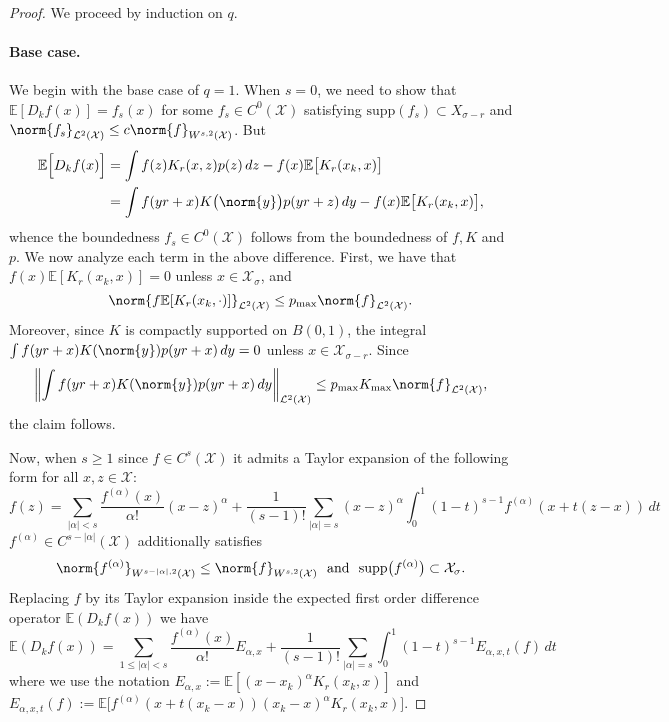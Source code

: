 \documentclass{article}
\newcommand{\abs}[1]{\left \lvert #1 \right \rvert}
\newcommand{\1}{\mathbf{1}}
\newcommand{\Xset}{\mathcal{X}}
\newcommand{\Leb}{\mathcal{L}}
\newcommand{\Ebb}{\mathbb{E}}
\theoremstyle{alden}
\theoremstyle{aldenthm}
\theoremstyle{definition}
\theoremstyle{remark}
\begin{document}
\begin{proof}	
	We proceed by induction on $q$. 
	
	\paragraph{Base case.}
	We begin with the base case of $q = 1$. When $s = 0$, we need to show that $\Ebb[D_kf(x)] = f_s(x)$ for some $f_s \in C^{0}(\Xset)$ satisfying $\mathrm{supp}(f_s) \subset X_{\sigma - r}$ and $\norm{f_s}_{\Leb^2(\Xset)} \leq c\norm{f}_{W^{s,2}(\Xset)}$. But
	\begin{align*}
	\Ebb\Bigl[D_kf(x)\Bigr] & = \int f(z) K_r(x,z) p(z) \,dz  - f(x)\Ebb\bigl[K_r(x_k,x)\bigr] \\
	& = \int f(yr + x) K\bigl(\norm{y}\bigr) p(yr + z) \,dy - f(x)\Ebb\bigl[K_r(x_k,x)\bigr],
	\end{align*}
	whence the boundedness $f_s \in C^{0}(\Xset)$ follows from the boundedness of $f, K$ and $p$. We now analyze each term in the above difference. First, we have that $f(x)\Ebb[K_r(x_k,x)] = 0$ unless $x \in \Xset_{\sigma}$, and 
	\begin{equation*}
	\norm{f\Ebb[K_r(x_k,\cdot)]}_{\Leb^2(\Xset)} \leq p_{\max} \norm{f}_{\Leb^2(\Xset)}.
	\end{equation*}
	Moreover, since $K$ is compactly supported on $B(0,1)$, the integral $\int f(yr + x) K(\norm{y}) p(yr + x) \,dy = 0$ unless $x \in \Xset_{\sigma - r}$. Since
	\begin{equation*}
	\biggl\|\int f(yr + x) K(\norm{y}) p(yr + x) \,dy\biggr\|_{\Leb^2(\Xset)} \leq p_{\max} K_{\max} \norm{f}_{\Leb^2(\Xset)},
	\end{equation*}
	the claim follows.
	
	Now, when $s \geq 1$ since $f \in C^{s}(\Xset)$ it admits a Taylor expansion of the following form for all $x,z \in \Xset$:
	\begin{equation*}
	f(z) = \sum_{\abs{\alpha} < s} \frac{f^{(\alpha)}(x)}{\alpha!} (x - z)^{\alpha} + \frac{1}{(s - 1)!}\sum_{\abs{\alpha} = s} (x - z)^{\alpha} \int_{0}^{1}(1 - t)^{s - 1} f^{(\alpha)}(x + t(z - x)) \,dt
	\end{equation*}
	$f^{(\alpha)} \in C^{s - \abs{\alpha}}(\Xset)$ additionally satisfies
	\begin{equation*}
	\norm{f^{(\alpha)}}_{W^{s - \abs{\alpha},2}(\Xset)} \leq \norm{f}_{W^{s,2}(\Xset)} ~~\textrm{and}~~ \mathrm{supp}\bigl(f^{(\alpha)}\bigr) \subset {\Xset}_{\sigma}.
	\end{equation*}
	Replacing $f$ by its Taylor expansion inside the expected first order difference operator $\Ebb(D_kf(x))$ we have
	\begin{equation}
	\label{eqn:leading_term_sobolev_pf1}
	\Ebb(D_kf(x)) = \sum_{1 \leq \abs{\alpha} < s} \frac{f^{(\alpha)}(x)}{\alpha!} E_{\alpha,x} + \frac{1}{(s - 1)!}\sum_{\abs{\alpha} = s} \int_{0}^{1}(1 - t)^{s - 1} E_{\alpha,x,t}(f)  \,dt 
	\end{equation}
	where we use the notation $E_{\alpha,x} := \Ebb\left[(x - x_k)^{\alpha}K_r(x_k,x)\right]$ and  $E_{\alpha,x,t}(f) := \Ebb\bigl[f^{(\alpha)}(x + t(x_k - x)) (x_k - x)^{\alpha} K_r(x_k,x)\bigr]$.
	

\end{proof}
\end{document}

